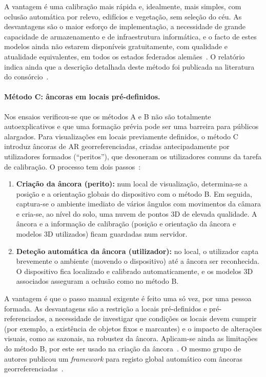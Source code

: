 A vantagem é uma calibração mais rápida e, idealmente, mais simples, com oclusão automática por relevo, edifícios e vegetação, sem seleção do céu. As desvantagens são o maior esforço de implementação, a necessidade de grande capacidade de armazenamento e de infraestrutura informática, e o facto de estes modelos ainda não estarem disponíveis gratuitamente, com qualidade e atualidade equivalentes, em todos os estados federados alemães~\cite[Sec.~2.2.2.3]{ar4wind2023}. O relatório indica ainda que a descrição detalhada deste método foi publicada na literatura do consórcio~\cite{burkard2022gistam,burkard2022icict,burkard2022eis}.

\paragraph{Método C: âncoras em locais pré-definidos.}
\label{sec:ar4wind_metodoC}
Nos ensaios verificou-se que os métodos A e B não são totalmente autoexplicativos e que uma formação prévia pode ser uma barreira para públicos alargados. Para visualizações em locais previamente definidos, o método C introduz âncoras de AR georreferenciadas, criadas antecipadamente por utilizadores formados (``peritos''), que desoneram os utilizadores comuns da tarefa de calibração. O processo tem dois passos~\cite[Sec.~2.2.2.4]{ar4wind2023}:

\begin{enumerate}
    \item \textbf{Criação da âncora (perito):} num local de visualização, determina-se a posição e a orientação globais do dispositivo com o método B. Em seguida, captura-se o ambiente imediato de vários ângulos com movimentos da câmara e cria-se, ao nível do solo, uma nuvem de pontos 3D de elevada qualidade. A âncora e a informação de calibração (posição e orientação da âncora e modelos 3D utilizados) ficam guardadas num servidor.
    \item \textbf{Deteção automática da âncora (utilizador):} no local, o utilizador capta brevemente o ambiente (movendo o dispositivo) até a âncora ser reconhecida. O dispositivo fica localizado e calibrado automaticamente, e os modelos 3D associados asseguram a oclusão como no método B.
\end{enumerate}

A vantagem é que o passo manual exigente é feito uma só vez, por uma pessoa formada. As desvantagens são a restrição a locais pré-definidos e pré-referenciados, a necessidade de investigar que condições os locais devem cumprir (por exemplo, a existência de objetos fixos e marcantes) e o impacto de alterações visuais, como as sazonais, na robustez da âncora. Aplicam-se ainda as limitações do método B, por este ser usado na criação da âncora~\cite[Sec.~2.2.2.4]{ar4wind2023}. O mesmo grupo de autores publicou um \textit{framework} para registo global automático com âncoras georreferenciadas~\cite{burkard2024anchors}.

